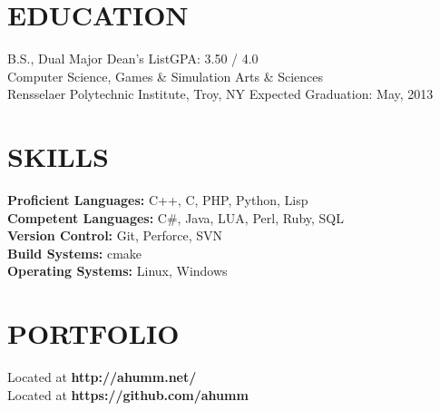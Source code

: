 \documentclass[margin,11pt]{res} %
\begin{document}

\address{{\bf Permanent Address} \\  9845 NE 27th st  \\ Bellevue, WA, 98004}
\address{ {\bf Contact Info} \\ http://ahumm.net/ \\ tate.larsen@ahumm.net \\ (425) 283-3847}



\begin{resume}
\section{EDUCATION}       B.S., Dual Major \hfill Dean's List\hfill GPA: 3.50 / 4.0 \\
                Computer Science, Games \& Simulation Arts \& Sciences  \\
                Rensselaer Polytechnic Institute, Troy, NY \hfill Expected Graduation: May, 2013
 
\section{SKILLS}       {\bf Proficient Languages:} C++, C, PHP, Python, Lisp \\
                {\bf Competent Languages:} C\#, Java, LUA, Perl, Ruby, SQL \\
                {\bf Version Control:} Git, Perforce, SVN \\
                {\bf Build Systems:} cmake \\
                {\bf Operating Systems:} Linux, Windows
 
\section{PORTFOLIO}      
        {\sc Located at {\bf http://ahumm.net/}} \\
        {\sc Located at {\bf https://github.com/ahumm}}
                         


\end{resume}
\end{document}
